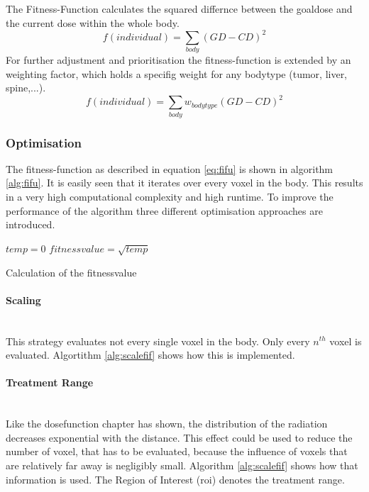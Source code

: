 \documentclass[12pt]{article}
\begin{document}
 The Fitness-Function calculates the squared differnce between the goaldose and the current dose within the whole body.
 \begin{equation}
 f(individual) = \sum_{body}(GD-CD)^2
 \end{equation}
 For further adjustment and prioritisation the fitness-function is extended by an weighting factor, which holds a specifig weight for any bodytype (tumor, liver, spine,...).
 \begin{equation}
 \label{eq:fifu}
 f(individual) = \sum_{body}w_{bodytype}(GD-CD)^2
 \end{equation}

\subsubsection{Optimisation}
\label{subsubsec:optimisation}
The fitness-function as described in equation \eqref{eq:fifu} is shown in algorithm \ref{alg:fifu}. It is easily seen that it iterates over every voxel in the body. This results in a very high computational complexity and high runtime. To improve the performance of the algorithm three different optimisation approaches are introduced. \\

\begin{algorithm}[H]
\label{alg:fifu}
 $temp=0$\;
 $fitnessvalue = \sqrt{temp}$\;
 \;
 \caption{Calculation of the fitnessvalue}
 
 \end{algorithm}


\paragraph{Scaling}
\label{para:scaling}
~\\
This strategy evaluates not every single voxel in the body. Only every $n^{th}$ voxel is evaluated. Algortithm \ref{alg:scalefif} shows how this is implemented. \\

\paragraph{Treatment Range}
\label{para:treatment range}
~\\
Like the dosefunction chapter has shown, the distribution of the radiation decreases exponential with the distance. This effect could be used to reduce the number of voxel, that has to be evaluated, because the influence of voxels that are relatively far away is negligibly small. Algorithm \ref{alg:scalefif} shows how that information is used. The Region of Interest (roi) denotes the treatment range. \\
\end{document}
